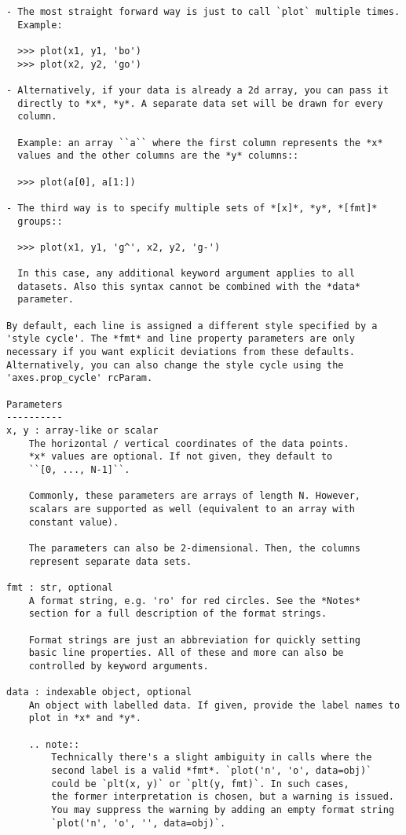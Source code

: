 \documentclass[11pt]{article}
\begin{document}
\begin{verbatim}
- The most straight forward way is just to call `plot` multiple times.
  Example:

  >>> plot(x1, y1, 'bo')
  >>> plot(x2, y2, 'go')

- Alternatively, if your data is already a 2d array, you can pass it
  directly to *x*, *y*. A separate data set will be drawn for every
  column.

  Example: an array ``a`` where the first column represents the *x*
  values and the other columns are the *y* columns::

  >>> plot(a[0], a[1:])

- The third way is to specify multiple sets of *[x]*, *y*, *[fmt]*
  groups::

  >>> plot(x1, y1, 'g^', x2, y2, 'g-')

  In this case, any additional keyword argument applies to all
  datasets. Also this syntax cannot be combined with the *data*
  parameter.

By default, each line is assigned a different style specified by a
'style cycle'. The *fmt* and line property parameters are only
necessary if you want explicit deviations from these defaults.
Alternatively, you can also change the style cycle using the
'axes.prop_cycle' rcParam.

Parameters
----------
x, y : array-like or scalar
    The horizontal / vertical coordinates of the data points.
    *x* values are optional. If not given, they default to
    ``[0, ..., N-1]``.

    Commonly, these parameters are arrays of length N. However,
    scalars are supported as well (equivalent to an array with
    constant value).

    The parameters can also be 2-dimensional. Then, the columns
    represent separate data sets.

fmt : str, optional
    A format string, e.g. 'ro' for red circles. See the *Notes*
    section for a full description of the format strings.

    Format strings are just an abbreviation for quickly setting
    basic line properties. All of these and more can also be
    controlled by keyword arguments.

data : indexable object, optional
    An object with labelled data. If given, provide the label names to
    plot in *x* and *y*.

    .. note::
        Technically there's a slight ambiguity in calls where the
        second label is a valid *fmt*. `plot('n', 'o', data=obj)`
        could be `plt(x, y)` or `plt(y, fmt)`. In such cases,
        the former interpretation is chosen, but a warning is issued.
        You may suppress the warning by adding an empty format string
        `plot('n', 'o', '', data=obj)`.



\end{verbatim}
\end{document}
